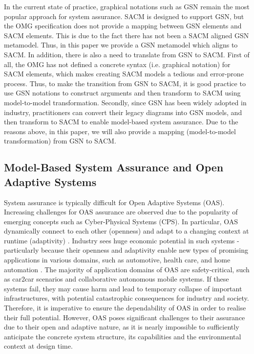 In the current state of practice, graphical notations such as GSN remain the most popular approach for system assurance. 
SACM is designed to support GSN, but the OMG specification does not provide a mapping between GSN elements and SACM elements. 
This is due to the fact there has not been a SACM aligned GSN metamodel. 
Thus, in this paper we provide a GSN metamodel which aligns to SACM. 
In addition, there is also a need to translate from GSN to SACM. 
First of all, the OMG has not defined a concrete syntax (i.e. graphical notation) for SACM elements, which makes creating SACM models a tedious and error-prone process. 
Thus, to make the transition from GSN to SACM, it is good practice to use GSN notations to construct arguments and then transform to SACM using model-to-model transformation. 
Secondly, since GSN has been widely adopted in industry, practitioners can convert their legacy diagrams into GSN models, and then transform to SACM to enable model-based system assurance. 
Due to the reasons above, in this paper, we will also provide a mapping (model-to-model transformation) from GSN to SACM.

\subsection{Model-Based System Assurance and Open Adaptive Systems}
System assurance is typically difficult for Open Adaptive Systems (OAS). 
Increasing challenges for OAS assurance are observed due to the popularity of emerging concepts such as Cyber-Physical Systems (CPS).
In particular, OAS dynamically connect to each other (openness) and adapt to a changing context at runtime (adaptivity) \cite{trapp2013safety}.
Industry sees huge economic potential in such systems - particularly because their openness and adaptivity enable new types of promising applications in various domains, such as automotive, health care, and home automation \cite{wei2017deis}.
The majority of application domains of OAS are safety-critical, such as car2car scenarios and collaborative autonomous mobile systems.
If these systems fail, they may cause harm and lead to temporary collapse of important infrastructures, with potential catastrophic consequences for industry and society.
Therefore, it is imperative to ensure the dependability of OAS in order to realise their full potential. 
However, OAS poses significant challenges to their assurance due to their open and adaptive nature, as it is nearly impossible to sufficiently anticipate the concrete system structure, its capabilities and the environmental context at design time.


